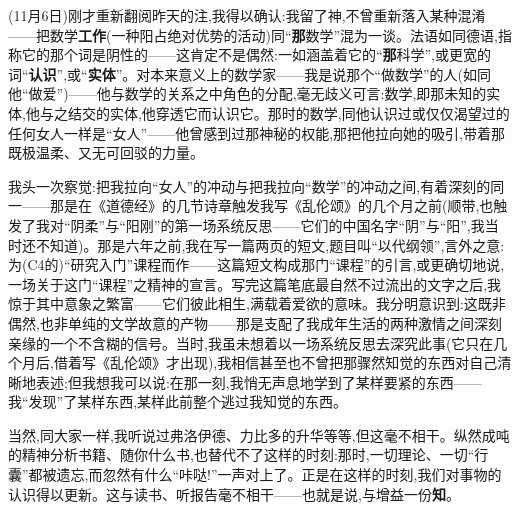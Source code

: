 \label{ch18:local:n24}

(11月6日)刚才重新翻阅昨天的注,我得以确认:我留了神,不曾重新落入某种混淆——把数学\textbf{工作}(一种阳占绝对优势的活动)同“\textbf{那}数学”混为一谈。法语如同德语,指称它的那个词是阴性的——这肯定不是偶然:一如涵盖着它的“\textbf{那}科学\dmark{}”,或更宽的词“\textbf{认识}”,或“\textbf{实体}”。对本来意义上的数学家——我是说那个“做数学”的人(如同他“做爱”)——他与数学的关系之中角色的分配,毫无歧义可言:数学,即那未知的实体,他与之结交的实体,他穿透它而认识它。那时的数学,同他认识过或仅仅渴望过的任何女人一样是“女人”——他曾感到过那神秘的权能,那把他拉向她的吸引,带着那既极温柔、又无可回驳的力量。

我头一次察觉:把我拉向“女人”的冲动与把我拉向“数学”的冲动之间,有着深刻的同一——那是在《道德经》的几节诗章触发我写《乱伦颂》的几个月之前(顺带,也触发了我对“阴柔”与“阳刚”的第一场系统反思——它们的中国名字“阴”与“阳”,我当时还不知道)。那是六年之前,我在写一篇两页的短文,题目叫“以代纲领”,言外之意:为(C4的)“研究入门”课程而作——这篇短文构成那门“课程”的引言,或更确切地说,一场关于这门“课程”之精神的宣言。写完这篇笔底最自然不过流出的文字之后,我惊于其中意象之繁富——它们彼此相生,满载着爱欲的意味。我分明意识到:这既非偶然,也非单纯的文学故意的产物——那是支配了我成年生活的两种激情之间深刻亲缘的一个不含糊的信号。当时,我虽未想着以一场系统反思去深究此事(它只在几个月后,借着写《乱伦颂》才出现),我相信甚至也不曾把那骤然知觉的东西对自己清晰地表述;但我想我可以说:在那一刻,我悄无声息地学到了某样要紧的东西——我“发现”了某样东西,某样此前整个逃过我知觉的东西。

当然,同大家一样,我听说过弗洛伊德、力比多的升华等等,但这毫不相干。纵然成吨的精神分析书籍、随你什么书,也替代不了这样的时刻:那时,一切理论、一切“行囊”都被遗忘,而忽然有什么\dmark{}“咔哒!”一声对上了。正是在这样的时刻,我们对事物的认识得以更新。这与读书、听报告毫不相干——也就是说,与增益一份\textbf{知}。

